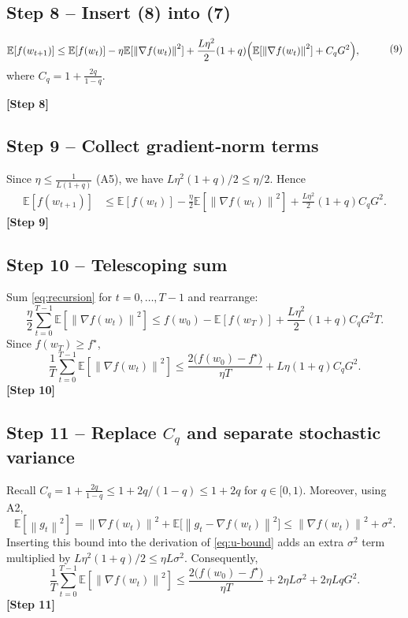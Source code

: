 \documentclass{article}
\newcommand{\E}{\mathbb{E}}
\newcommand{\norm}[1]{\left\|#1\right\|}
\begin{document}
\subsection*{Step 8 – Insert (8) into (7)}
\[
\begin{aligned}
\E[f(w_{t+1})]
&\le \E[f(w_{t})]
      -\eta\E[\norm{\nabla f(w_{t})}^{2}]
      +\frac{L\eta^{2}}{2}(1+q)\Bigl(\E[\norm{\nabla f(w_{t})}^{2}]
                + C_{q}G^{2}\Bigr),
\end{aligned}
\tag{9}\label{eq:after-u}
\]
where $C_{q}=1+\frac{2q}{1-q}$.

\noindent\textbf{[Step 8]}

\subsection*{Step 9 – Collect gradient‑norm terms}
Since $\eta\le\frac{1}{L(1+q)}$ (A5), we have $L\eta^{2}(1+q)/2\le \eta/2$. Hence
\[
\begin{aligned}
\E[f(w_{t+1})]
&\le \E[f(w_{t})]
      -\frac{\eta}{2}\E[\norm{\nabla f(w_{t})}^{2}]
      +\frac{L\eta^{2}}{2}(1+q)C_{q}G^{2}.
\end{aligned}
\tag{10}\label{eq:recursion}
\]
\noindent\textbf{[Step 9]}

\subsection*{Step 10 – Telescoping sum}
Sum \eqref{eq:recursion} for $t=0,\dots,T-1$ and rearrange:
\[
\frac{\eta}{2}\sum_{t=0}^{T-1}\E[\norm{\nabla f(w_{t})}^{2}]
\le f(w_{0})- \E[f(w_{T})] + \frac{L\eta^{2}}{2}(1+q)C_{q}G^{2}T.
\]
Since $f(w_{T})\ge f^{\star}$,
\[
\frac{1}{T}\sum_{t=0}^{T-1}\E[\norm{\nabla f(w_{t})}^{2}]
\le \frac{2\bigl(f(w_{0})-f^{\star}\bigr)}{\eta T}
    + L\eta(1+q)C_{q}G^{2}.
\tag{11}\label{eq:avg-grad}
\]
\noindent\textbf{[Step 10]}

\subsection*{Step 11 – Replace $C_{q}$ and separate stochastic variance}
Recall $C_{q}=1+\frac{2q}{1-q}\le 1+2q/(1-q)\le 1+2q$ for $q\in[0,1)$. Moreover, using A2,
\[
\E[\norm{g_{t}}^{2}]
= \norm{\nabla f(w_{t})}^{2}+ \E\bigl[\norm{g_{t}-\nabla f(w_{t})}^{2}\bigr]
\le \norm{\nabla f(w_{t})}^{2}+ \sigma^{2}.
\]
Inserting this bound into the derivation of \eqref{eq:u-bound} adds an extra $ \sigma^{2}$ term multiplied by $L\eta^{2}(1+q)/2\le \eta L\sigma^{2}$. Consequently,
\[
\frac{1}{T}\sum_{t=0}^{T-1}\E[\norm{\nabla f(w_{t})}^{2}]
\le \frac{2\bigl(f(w_{0})-f^{\star}\bigr)}{\eta T}
    + 2\eta L\sigma^{2}
    + 2\eta L q G^{2}.
\tag{12}\label{eq:final-bound}
\]
\noindent\textbf{[Step 11]}
\end{document}
